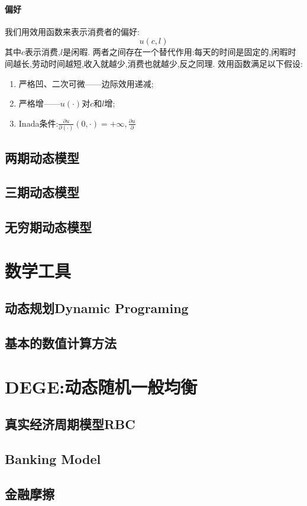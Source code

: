 \documentclass[lang=cn,10pt]{elegantbook}
\begin{document}
\subsection{偏好}
我们用效用函数来表示消费者的偏好:
$$u(c,l)$$
其中$c$表示消费,$l$是闲暇. 两者之间存在一个替代作用:每天的时间是固定的,闲暇时间越长,劳动时间越短,收入就越少,消费也就越少,反之同理.
效用函数满足以下假设:
\begin{enumerate}
   \item 严格凹、二次可微——边际效用递减;
   \item 严格增——$u(\cdot)$对$c$和$l$增;
   \item Inada条件:$\frac{\partial u}{\partial (\cdot)}(0,\cdot)=+\infty,\frac{\partial u}{\partial }$
\end{enumerate}
\newpage

\chapter{两期动态模型}
\newpage

\chapter{三期动态模型}
\newpage

\chapter{无穷期动态模型}
\newpage

\part{数学工具}
\chapter{动态规划Dynamic Programing}

\chapter{基本的数值计算方法}

\part{DEGE:动态随机一般均衡}
\chapter{真实经济周期模型RBC}

\chapter{Banking Model}

\chapter{金融摩擦}
\end{document}
